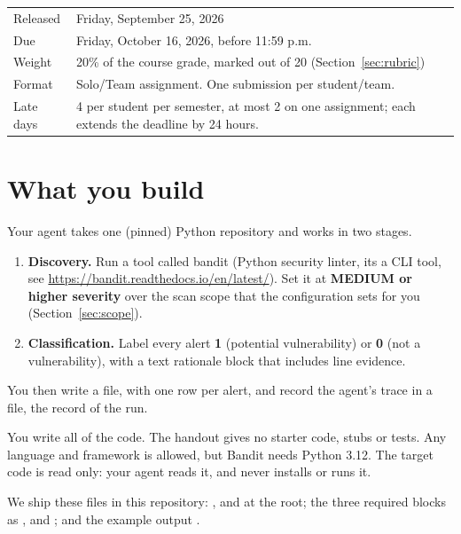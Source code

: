 \documentclass[9pt,letterpaper]{article}
\begin{document}
\begin{center}
\begin{tabularx}{\linewidth}{@{}lX@{}}
\toprule
Released & Friday, September 25, 2026 \\
Due & Friday, October 16, 2026, before 11:59 p.m. \\
Weight & 20\% of the course grade, marked out of 20 (Section~\ref{sec:rubric}) \\
Format & Solo/Team assignment. One submission per student/team. \\
Late days & 4 per student per semester, at most 2 on one assignment; each extends the deadline by 24 hours. \\
\bottomrule
\end{tabularx}
\end{center}

\section{What you build}

Your agent takes one (pinned) Python repository and works in two stages.
\begin{enumerate}

  \item \textbf{Discovery.} Run a tool called bandit (Python security linter, its a CLI tool, see \url{https://bandit.readthedocs.io/en/latest/}).
Set it at \textbf{MEDIUM or higher severity} over the scan scope that the configuration sets for you (Section~\ref{sec:scope}).

\item \textbf{Classification.} Label every alert \textbf{1} (potential vulnerability)
  or \textbf{0} (not a vulnerability), with a text rationale block that includes line evidence.
\end{enumerate}

You then write a  file, with one row per alert, and record the agent's trace in a  file, the record of the run.

You write all of the code. The handout gives no starter code, stubs or tests.
Any language and framework is allowed, but Bandit needs Python 3.12. The target
code is read only: your agent reads it, and never installs or runs it.

We ship these files in this repository: ,
 and  at the root; the three
required \code{[scan]} blocks as ,
 and ;
and the example output .
\end{document}
